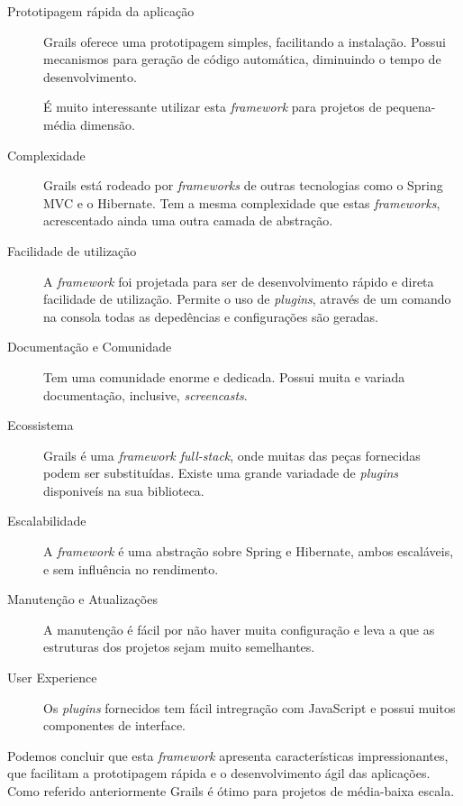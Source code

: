 \begin{description}
\item[Prototipagem rápida da aplicação] Grails oferece uma prototipagem simples, facilitando a instalação. Possui mecanismos para geração de código automática, diminuindo o tempo de desenvolvimento.

É muito interessante utilizar esta \textit{framework} para projetos de pequena-média dimensão.

\item[Complexidade] Grails está rodeado por \textit{frameworks} de outras tecnologias como o Spring MVC e o Hibernate. Tem a mesma complexidade que estas \textit{frameworks}, acrescentado ainda uma outra camada de abstração.

\item[Facilidade de utilização] A \textit{framework} foi projetada para ser de desenvolvimento rápido e direta facilidade de utilização. Permite o uso de \textit{plugins}, através de um comando na consola todas as depedências e configurações são geradas.

\item[Documentação e Comunidade] Tem uma comunidade enorme e dedicada. Possui muita e variada documentação, inclusive, \textit{screencasts}.

\item[Ecossistema] Grails é uma \textit{framework full-stack}, onde muitas das peças fornecidas podem ser substituídas. Existe uma grande variadade de \textit{plugins} disponiveís na sua biblioteca.

\item[Escalabilidade] A \textit{framework} é uma abstração sobre Spring e Hibernate, ambos escaláveis, e sem influência no rendimento.

\item[Manutenção e Atualizações] A manutenção é fácil por não haver muita configuração e leva a que as estruturas dos projetos sejam muito semelhantes.

\item[User Experience] Os \textit{plugins} fornecidos tem fácil intregração com JavaScript e possui muitos componentes de interface.
\end{description}

Podemos concluir que esta \textit{framework} apresenta características impressionantes, que facilitam a prototipagem rápida e o desenvolvimento ágil das aplicações. Como referido anteriormente Grails é ótimo para projetos de média-baixa escala.

